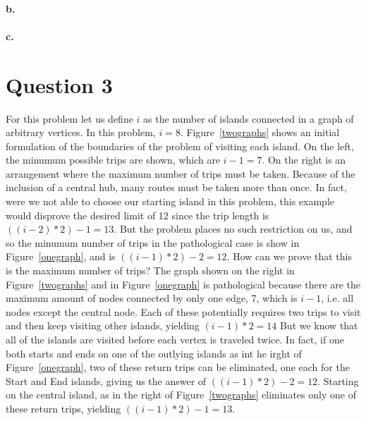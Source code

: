 \documentclass[12pt]{article}
\begin{document}


\paragraph{b.} %
\label{par:b_}



\paragraph{c.} %
\label{par:paragraph_name}


\clearpage
\section*{Question 3}
For this problem let us define $i$ as the number of islands connected in a graph of arbitrary vertices. In this problem, $i=8$. Figure~\ref{twographs} shows an initial formulation of the boundaries of the problem of visiting each island.  On the left, the minumum possible trips are shown, which are $i-1 =7$.  On the right is an arrangement where the maximum number of trips must be taken.  Because of the inclusion of a central hub, many routes must be taken more than once.  In fact, were we not able to choose our starting island in this problem, this example would disprove the desired limit of 12 since the trip length is $((i-2)*2)-1=13$. 
But the problem places no such restriction on us, and so the minumum number of trips in the pathological case is show in Figure~\ref{onegraph}, and is $((i-1)*2)-2=12$.  How can we prove that this is the maximum number of trips?  The graph shown on the right in Figure~\ref{twographs} and in Figure~\ref{onegraph} is pathological because there are the maximum amount of nodes connected by only one edge, 7, which is $i-1$, i.e. all nodes except the central node.  Each of these potentially requires two trips to visit and then keep visiting other islands, yielding $(i-1)*2=14$  But we know that all of the islands are visited before each vertex is traveled twice.  In fact, if one both starts and ends on one of the outlying islands as int he irght of Figure~\ref{onegraph}, two of these return trips can be eliminated, one each for the Start and End islands, giving us the answer of $((i-1)*2)-2=12$.  Starting on the central island, as in the right of Figure~\ref{twographs} eliminates only one of these return trips, yielding $((i-1)*2)-1=13$.
\end{document}
